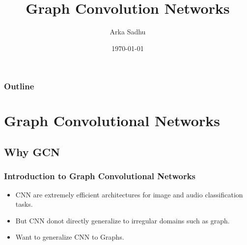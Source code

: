 \documentclass{beamer}
\title{Graph Convolution Networks}
\author{Arka Sadhu}
\institute{IIT Bombay}
\date{\today}
\begin{document}


\begin{frame}
\titlepage
\end{frame}

\begin{frame}
\frametitle{Outline}
\tableofcontents
\end{frame}

\section{Graph Convolutional Networks}
\subsection{Why GCN}
\begin{frame}
  \frametitle{Introduction to Graph Convolutional Networks}
  \begin{itemize}
  \item <1-> CNN are extremely efficient architectures for image and audio classification tasks.
  \item <1-> But CNN donot directly generalize to irregular domains such as graph.
  \item <2-> Want to generalize CNN to Graphs.
  \end{itemize}
\end{frame}
\end{document}
